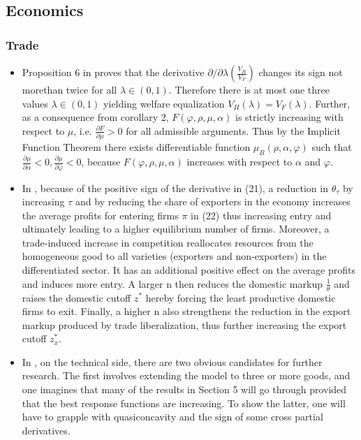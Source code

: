 \documentclass[11pt]{book}
\begin{document}
\subsection{Economics}
\subsubsection{Trade}
\begin{itemize}
\item Proposition 6 in \cite{sidorov2011impact}
proves that the derivative $\partial/\partial\lambda\left(\frac{V_{H}}{V_{F}}\right)$
changes its sign not morethan twice for all $\lambda\in(0,1)$. Therefore
there is at most one three values $\lambda\in(0,1)$ yielding welfare
equalization $V_{H}\left(\lambda\right)=V_{F}\left(\lambda\right)$.
Further, as a consequence from corollary 2, $F\left(\varphi,\rho,\mu,\alpha\right)$
is strictly increasing with respect to $\mu$, i.e. $\frac{\partial F}{\partial\mu}>0$
for all admissible arguments. Thus by the Implicit Function Theorem
there exists differentiable function $\mu_{B}\left(\rho,\alpha,\varphi\right)$
such that $\frac{\partial\mu}{\partial\alpha}<0,\frac{\partial\mu}{\partial\varphi}<0$,
because $F\left(\varphi,\rho,\mu,\alpha\right)$ increases with respect
to $\alpha$ and $\varphi$.
\item In \cite{impullitti2018trade},
because of the positive sign of the derivative in (21), a reduction
in $\theta_{\tau}$ by increasing $\tau$ and by reducing the share
of exporters in the economy increases the average profits for entering
firms $\pi$ in (22) thus increasing entry and ultimately leading
to a higher equilibrium number of firms. Moreover, a trade-induced
increase in competition reallocates resources from the homogeneous
good to all varieties (exporters and non-exporters) in the differentiated
sector. It has an additional positive effect on the average profits
and induces more entry. A larger n then reduces the domestic markup
$\frac{1}{\theta}$ and raises the domestic cutoff $z^{*}$ hereby
forcing the least productive domestic firms to exit. Finally, a higher
n also strengthens the reduction in the export markup produced by
trade liberalization, thus further increasing the export cutoff $z_{x}^{*}$.
\item In \cite{chattopadhyay2019nash},
on the technical side, there are two obvious candidates for further
research. The first involves extending the model to three or more
goods, and one imagines that many of the results in Section 5 will
go through provided that the best response functions are increasing.
To show the latter, one will have to grapple with quasiconcavity and
the sign of some cross partial derivatives.
\end{itemize}
\end{document}

